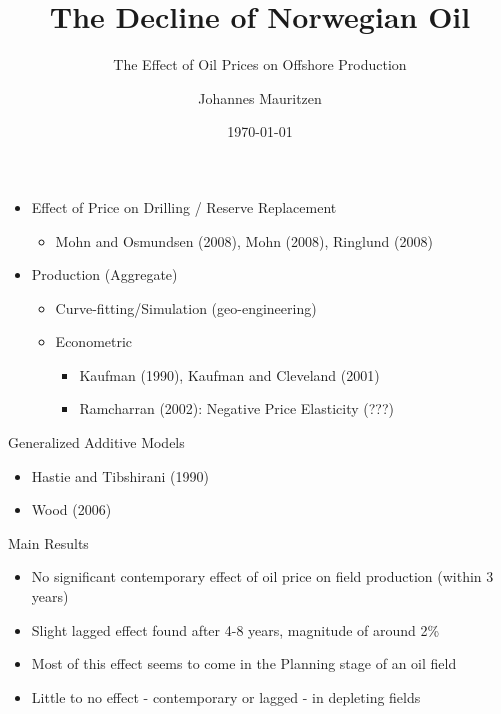 \documentclass{beamer}
\title[OIL]{The Decline of Norwegian Oil}
\subtitle[Errors]{The Effect of Oil Prices on Offshore Production}
\author[J. Mauritzen]{Johannes Mauritzen}
\institute[NHH]{
  \texttt{johannes.mauritzen@nhh.no}
}
\date{\today}
\begin{document}
\begin{frame}[plain]
  \titlepage
\end{frame}




\begin{frame}[plain]
	\begin{itemize}

	\item Effect of Price on Drilling / Reserve Replacement
	\begin{itemize} \item Mohn and Osmundsen (2008), Mohn (2008), Ringlund (2008) \end{itemize}
	 \item Production (Aggregate)

		\begin{itemize}
		\item Curve-fitting/Simulation (geo-engineering)
		\item Econometric
			\begin{itemize}
			\item Kaufman (1990), Kaufman and Cleveland (2001)
			\item Ramcharran (2002):  Negative Price Elasticity (???)
	 		\end{itemize}
	 	\end{itemize}
	\end{itemize}
\end{frame}

\begin{frame}[plain]
	Generalized Additive Models
	\begin{itemize}
	\item  Hastie and Tibshirani (1990) 
	\item  Wood (2006)
	\end {itemize}
\end{frame}

\begin{frame}[plain]
	Main Results
	\begin{itemize}
	\item  No significant contemporary effect of oil price on field production (within 3 years)
	\item Slight lagged effect found after 4-8 years, magnitude of around 2\%
	\item Most of this effect seems to come in the Planning stage of an oil field
	\item Little to no effect - contemporary or lagged - in depleting fields
	\end {itemize}
\end{frame}
\end{document}

